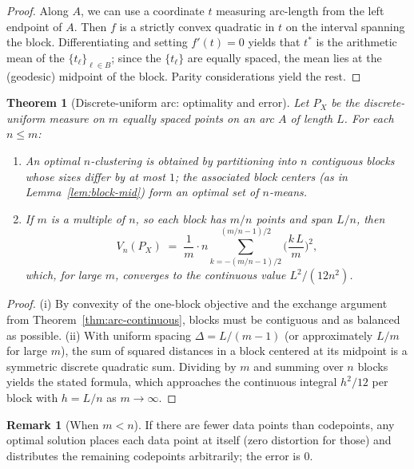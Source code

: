 \documentclass[12pt, reqno]{amsart}
\theoremstyle{plain}
\newtheorem{theorem}[subsection]{Theorem}
\theoremstyle{definition}
\newtheorem{remark}[subsection]{Remark}
\begin{document}
\begin{proof}
Along $A$, we can use a coordinate $t$ measuring arc-length from the left endpoint of $A$. Then $f$ is a strictly convex quadratic in $t$ on the interval spanning the block. Differentiating and setting $f'(t)=0$ yields that $t^\ast$ is the arithmetic mean of the $\{t_\ell\}_{\ell\in B}$; since the $\{t_\ell\}$ are equally spaced, the mean lies at the (geodesic) midpoint of the block. Parity considerations yield the rest.
\end{proof}

\begin{theorem}[Discrete-uniform arc: optimality and error]\label{thm:discrete-arc}
Let $P_X$ be the discrete-uniform measure on $m$ equally spaced points on an arc $A$ of length $L$. For each $n\le m$:
\begin{enumerate}[label=(\roman*), leftmargin=1.5em]
  \item An optimal $n$-clustering is obtained by partitioning into $n$ contiguous blocks whose sizes differ by at most $1$; the associated block centers (as in Lemma~\ref{lem:block-mid}) form an optimal set of $n$-means.
  \item If $m$ is a multiple of $n$, so each block has $m/n$ points and span $L/n$, then
  \[
  V_n(P_X)\;=\;\frac{1}{m}\cdot n\sum_{k=-(m/n-1)/2}^{(m/n-1)/2}\!\!\!\!\!\! \bigg(\frac{k\,L}{m}\bigg)^2,
  \]
  which, for large $m$, converges to the continuous value $L^2/(12n^2)$.
\end{enumerate}
\end{theorem}

\begin{proof}
(i) By convexity of the one-block objective and the exchange argument from Theorem~\ref{thm:arc-continuous}, blocks must be contiguous and as balanced as possible. (ii) With uniform spacing $\Delta=L/(m-1)$ (or approximately $L/m$ for large $m$), the sum of squared distances in a block centered at its midpoint is a symmetric discrete quadratic sum. Dividing by $m$ and summing over $n$ blocks yields the stated formula, which approaches the continuous integral $h^2/12$ per block with $h=L/n$ as $m\to\infty$.
\end{proof}

\begin{remark}[When $m<n$]
If there are fewer data points than codepoints, any optimal solution places each data point at itself (zero distortion for those) and distributes the remaining codepoints arbitrarily; the error is $0$.
\end{remark}
\end{document}
